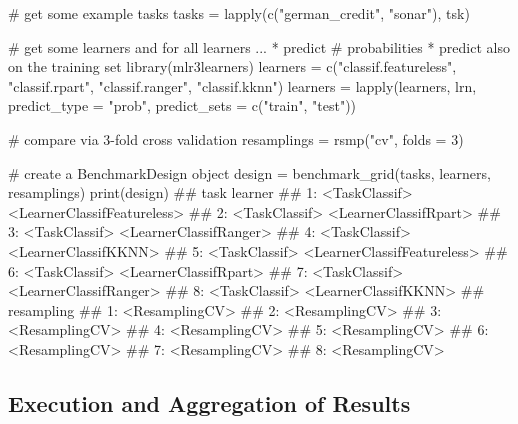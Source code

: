\documentclass[12pt,]{scrbook}
\newenvironment{Shaded}{}{}
\newcommand{\CommentTok}[1]{\textcolor[rgb]{0.00,0.50,0.00}{#1}}
\newcommand{\DataTypeTok}[1]{#1}
\newcommand{\DecValTok}[1]{#1}
\newcommand{\KeywordTok}[1]{\textcolor[rgb]{0.00,0.00,1.00}{#1}}
\newcommand{\NormalTok}[1]{#1}
\newcommand{\StringTok}[1]{\textcolor[rgb]{0.00,0.50,0.50}{#1}}
\begin{document}
\begin{Shaded}
\begin{Highlighting}[]
\CommentTok{# get some example tasks}
\NormalTok{tasks =}\StringTok{ }\KeywordTok{lapply}\NormalTok{(}\KeywordTok{c}\NormalTok{(}\StringTok{"german_credit"}\NormalTok{, }\StringTok{"sonar"}\NormalTok{), tsk)}

\CommentTok{# get some learners and for all learners ...  * predict}
\CommentTok{# probabilities * predict also on the training set}
\KeywordTok{library}\NormalTok{(mlr3learners)}
\NormalTok{learners =}\StringTok{ }\KeywordTok{c}\NormalTok{(}\StringTok{"classif.featureless"}\NormalTok{, }\StringTok{"classif.rpart"}\NormalTok{, }\StringTok{"classif.ranger"}\NormalTok{, }
  \StringTok{"classif.kknn"}\NormalTok{)}
\NormalTok{learners =}\StringTok{ }\KeywordTok{lapply}\NormalTok{(learners, lrn, }\DataTypeTok{predict_type =} \StringTok{"prob"}\NormalTok{, }\DataTypeTok{predict_sets =} \KeywordTok{c}\NormalTok{(}\StringTok{"train"}\NormalTok{, }
  \StringTok{"test"}\NormalTok{))}

\CommentTok{# compare via 3-fold cross validation}
\NormalTok{resamplings =}\StringTok{ }\KeywordTok{rsmp}\NormalTok{(}\StringTok{"cv"}\NormalTok{, }\DataTypeTok{folds =} \DecValTok{3}\NormalTok{)}

\CommentTok{# create a BenchmarkDesign object}
\NormalTok{design =}\StringTok{ }\KeywordTok{benchmark_grid}\NormalTok{(tasks, learners, resamplings)}
\KeywordTok{print}\NormalTok{(design)}
\NormalTok{##             task                     learner}
\NormalTok{## 1: <TaskClassif> <LearnerClassifFeatureless>}
\NormalTok{## 2: <TaskClassif>       <LearnerClassifRpart>}
\NormalTok{## 3: <TaskClassif>      <LearnerClassifRanger>}
\NormalTok{## 4: <TaskClassif>        <LearnerClassifKKNN>}
\NormalTok{## 5: <TaskClassif> <LearnerClassifFeatureless>}
\NormalTok{## 6: <TaskClassif>       <LearnerClassifRpart>}
\NormalTok{## 7: <TaskClassif>      <LearnerClassifRanger>}
\NormalTok{## 8: <TaskClassif>        <LearnerClassifKKNN>}
\NormalTok{##        resampling}
\NormalTok{## 1: <ResamplingCV>}
\NormalTok{## 2: <ResamplingCV>}
\NormalTok{## 3: <ResamplingCV>}
\NormalTok{## 4: <ResamplingCV>}
\NormalTok{## 5: <ResamplingCV>}
\NormalTok{## 6: <ResamplingCV>}
\NormalTok{## 7: <ResamplingCV>}
\NormalTok{## 8: <ResamplingCV>}
\end{Highlighting}
\end{Shaded}

\hypertarget{bm-exec}{%
\subsection{Execution and Aggregation of Results}\label{bm-exec}}
\end{document}
